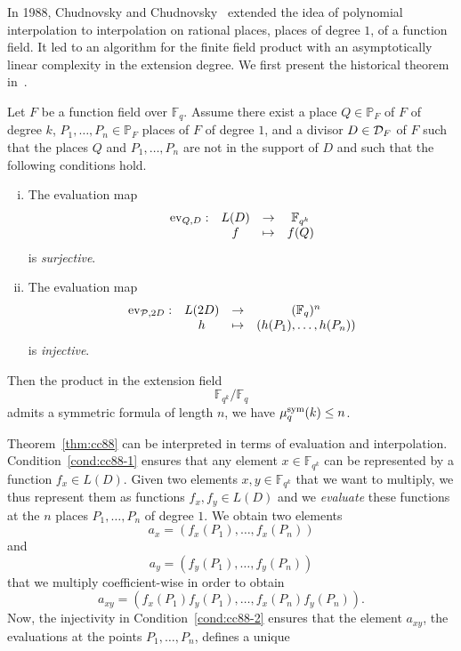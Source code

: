 In 1988, Chudnovsky and Chudnovsky~\cite{CC88} extended the idea of polynomial
interpolation to interpolation on rational places, \ie places of degree $1$, of
a function field. It led to an algorithm for the finite field product with an
asymptotically linear complexity in the extension degree. We first present the historical theorem
in~\cite{CC88}.
\begin{thm}
  \label{thm:cc88}
  Let $F$ be a function field over $\mathbb{F}_q$.
  Assume there exist a place $Q\in\mathbb{P}_{F}$ of $F$ of degree $k$, $P_1,
  \dots, P_n\in\mathbb{P}_F$ places of $F$ of degree $1$, and a divisor
  $D\in\mathcal{D}_F$ of $F$ such that the places $Q$ and $P_1, \dots, P_n$ are not in
  the support of $D$ and such that the following conditions hold.
  \begin{enumerate}[(i)]
    \item \label{cond:cc88-1} The evaluation map
      \[
        \begin{array}{cccc}
        \operatorname{ev}_{Q, D}: & L(D) & \to & \mathbb{F}_{q^k}\\
  & f & \mapsto & f(Q)
\end{array}
\]
is \emph{surjective}.
    \item \label{cond:cc88-2} The evaluation map
      \[
        \begin{array}{cccc}
        \operatorname{ev}_{\mathcal{P}, 2D}: & L(2D) & \to & (\mathbb{F}_{q})^n\\
  & h & \mapsto & (h(P_1), \dots, h(P_n))
\end{array}
\]
is \emph{injective}.
  \end{enumerate}
  Then the product in the extension field 
  \[
    \mathbb{F}_{q^k}/\mathbb{F}_q
  \]
  admits a symmetric formula of length $n$, \ie we have $\mu^{\textrm{sym}}_q(k)\leq n$.
\end{thm}
Theorem~\ref{thm:cc88} can be interpreted in terms of evaluation and
interpolation. Condition~\ref{cond:cc88-1} ensures that any element $x\in
\mathbb{F}_{q^k}$ can be represented by a function $f_x\in L(D)$. Given two
elements $x,y\in \mathbb{F}_{q^k}$ that we want to multiply, we thus represent
them as functions $f_x, f_y\in L(D)$ and we \emph{evaluate} these functions at the $n$
places $P_1, \dots, P_n$ of degree $1$. We obtain two elements
\[
  a_x = (f_x(P_1), \dots, f_x(P_n))
\]
and
\[
  a_y = (f_y(P_1), \dots, f_y(P_n))
\]
that we multiply coefficient-wise in order to obtain
\[
  a_{xy} = (f_{x}(P_1)f_y(P_1), \dots, f_x(P_n)f_y(P_n)).
\]
Now, the injectivity in Condition~\ref{cond:cc88-2} ensures that the element
$a_{xy}$, \ie the evaluations at the points $P_1, \dots, P_n$, defines a unique
